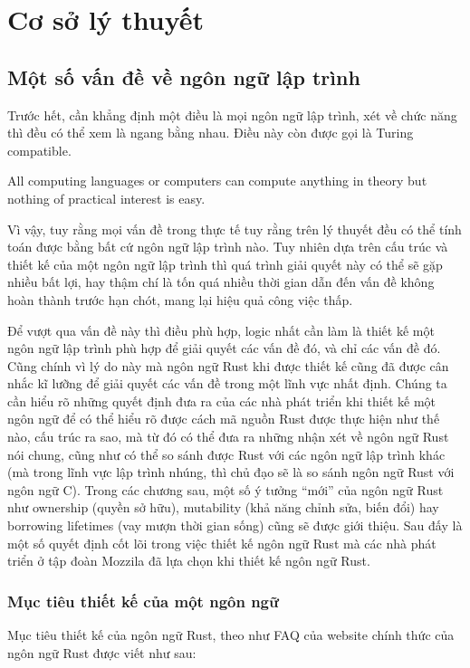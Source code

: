 \chapter{Cơ sở lý thuyết}\label{ch2-top}
\section{Một số vấn đề về ngôn ngữ lập trình}
Trước hết, cần khẳng định một điều là mọi ngôn ngữ lập trình, xét về chức năng thì đều có thể xem là ngang bằng nhau.
Điều này còn được gọi là Turing compatible.

All computing languages or computers can compute anything in theory but nothing of practical interest is easy.

Vì vậy, tuy rằng mọi vấn đề trong thực tế tuy rằng trên lý thuyết đều có thể tính toán được bằng bất cứ ngôn ngữ lập trình nào.
Tuy nhiên dựa trên cấu trúc và thiết kế của một ngôn ngữ lập trình thì quá trình giải quyết này có thể sẽ gặp nhiều bất lợi, hay thậm chí là tốn quá nhiều thời gian dẫn đến vấn đề không hoàn thành trước hạn chót, mang lại hiệu quả công việc thấp.

Để vượt qua vấn đề này thì điều phù hợp, logic nhất cần làm là thiết kế một ngôn ngữ lập trình phù hợp để giải quyết các vấn đề đó, và chỉ các vấn đề đó.
Cũng chính vì lý do này mà ngôn ngữ Rust khi được thiết kế cũng đã được cân nhắc kĩ lưỡng để giải quyết các vấn đề trong một lĩnh vực nhất định.
Chúng ta cần hiểu rõ những quyết định đưa ra của các nhà phát triển khi thiết kế một ngôn ngữ để có thể hiểu rõ được cách mã nguồn Rust được thực hiện như thế nào, cấu trúc ra sao, mà từ đó có thể đưa ra những nhận xét về ngôn ngữ Rust nói chung, cũng như có thể so sánh được Rust với các ngôn ngữ lập trình khác (mà trong lĩnh vực lập trình nhúng, thì chủ đạo sẽ là so sánh ngôn ngữ Rust với ngôn ngữ C).
Trong các chương sau, một số ý tưởng ``mới'' của ngôn ngữ Rust như ownership (quyền sở hữu), mutability (khả năng chỉnh sửa, biến đổi) hay borrowing lifetimes (vay mượn thời gian sống) cũng sẽ được giới thiệu.
Sau đấy là một số quyết định cốt lõi trong việc thiết kế ngôn ngữ Rust mà các nhà phát triển ở tập đoàn Mozzila đã lựa chọn khi thiết kế ngôn ngữ Rust.
\subsection{Mục tiêu thiết kế của một ngôn ngữ}
Mục tiêu thiết kế của ngôn ngữ Rust, theo như FAQ của website chính thức của ngôn ngữ Rust được viết như sau:
\bigskip

